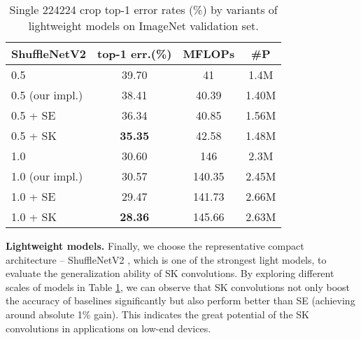 \documentclass[10pt,twocolumn,letterpaper]{article}
\begin{document}
	\begin{table}
		\small
		\centering
		\renewcommand\arraystretch{1.1}
		\newcommand{\tabincell}[2]{\begin{tabular}{@{}#1@{}}#2\end{tabular}}
		\begin{tabular}{l|c|c|c}
			\hline
			ShuffleNetV2  & top-1 err.(\%) & MFLOPs&\#P \\
			\hline
			0.5 \cite{ma2018shufflenet} & 39.70 & 41 & 1.4M\\
			0.5 (our impl.) & 38.41 & 40.39 & 1.40M\\
			0.5 + SE \cite{hu2017squeeze} & 36.34 & 40.85 & 1.56M\\
			0.5 + SK & \textbf{35.35}&42.58&1.48M\\
			\hline
			1.0 \cite{ma2018shufflenet} & 30.60 & 146 & 2.3M\\
			1.0 (our impl.) & 30.57 & 140.35&2.45M \\
			1.0 + SE \cite{hu2017squeeze} &29.47 &141.73 &2.66M\\
			1.0 + SK &\textbf{28.36}&145.66&2.63M \\
			\hline
		\end{tabular}
		\vspace{+4pt}
		\caption{Single 224224 crop top-1 error rates (\%) by variants of lightweight models on ImageNet validation set.}
		\label{table_small_model}
		\vspace{-6pt}
	\end{table}
	
	\vspace{6 pt}
	\noindent \textbf{Lightweight models.} Finally, we choose the representative compact architecture -- ShuffleNetV2 \cite{ma2018shufflenet}, which is one of the strongest light models, to evaluate the generalization ability of SK convolutions. By exploring different scales of models in Table \ref{table_small_model}, we can observe that SK convolutions not only boost the accuracy of baselines significantly but also perform better than SE \cite{hu2017squeeze} (achieving around absolute 1\% gain). This indicates the great potential of the SK convolutions in applications on low-end devices.
	
	
	
\end{document}
